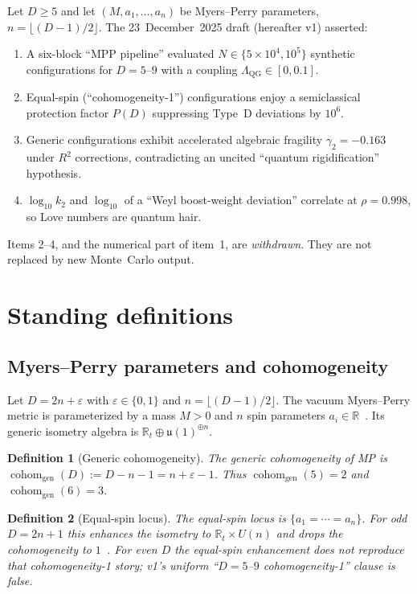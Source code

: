 \documentclass[11pt,a4paper]{article}
\newtheorem{definition}{Definition}[section]
\begin{document}
Let \(D\ge5\) and let \((M,a_1,\dots,a_n)\) be Myers--Perry parameters,
\(n=\lfloor(D-1)/2\rfloor\). The 23~December~2025 draft (hereafter v1)
asserted:
\begin{enumerate}[leftmargin=1.4em]
\item A six-block ``MPP pipeline'' evaluated
\(N\in\{5\times10^4,10^5\}\) synthetic configurations for \(D=5\)--\(9\)
with a coupling \(\Lambda_{\mathrm{QG}}\in[0,0.1]\).
\item Equal-spin (``cohomogeneity-1'') configurations enjoy a
semiclassical protection factor \(P(D)\) suppressing Type~D deviations
by \(10^6\).
\item Generic configurations exhibit accelerated algebraic fragility
\(\gamma_2=-0.163\) under \(R^2\) corrections, contradicting an uncited
``quantum rigidification'' hypothesis.
\item \(\log_{10}k_2\) and \(\log_{10}\) of a ``Weyl boost-weight
deviation'' correlate at \(\rho=0.998\), so Love numbers are quantum
hair.
\end{enumerate}
Items 2--4, and the numerical part of item~1, are \emph{withdrawn}.
They are not replaced by new Monte~Carlo output.

\section{Standing definitions}

\subsection{Myers--Perry parameters and cohomogeneity}

Let \(D=2n+\varepsilon\) with \(\varepsilon\in\{0,1\}\) and
\(n=\lfloor(D-1)/2\rfloor\). The vacuum Myers--Perry metric is
parameterized by a mass \(M>0\) and \(n\) spin parameters
\(a_i\in\mathbb{R}\)~\cite{MyersPerry1986}. Its generic isometry algebra
is \(\mathbb{R}_t\oplus\mathfrak{u}(1)^{\oplus n}\).

\begin{definition}[Generic cohomogeneity]
The generic cohomogeneity of MP is
\(\operatorname{cohom}_{\mathrm{gen}}(D):=D-n-1=n+\varepsilon-1\).
Thus \(\operatorname{cohom}_{\mathrm{gen}}(5)=2\) and
\(\operatorname{cohom}_{\mathrm{gen}}(6)=3\).
\end{definition}

\begin{definition}[Equal-spin locus]
The equal-spin locus is \(\{a_1=\cdots=a_n\}\). For odd \(D=2n+1\) this
enhances the isometry to \(\mathbb{R}_t\times U(n)\) and drops the
cohomogeneity to \(1\)~\cite{GibbonsLuPagePope2004}. For even \(D\) the
equal-spin enhancement does \emph{not} reproduce that cohomogeneity-1
story; v1's uniform ``\(D=5\)--\(9\) cohomogeneity-1'' clause is false.
\end{definition}
\end{document}
